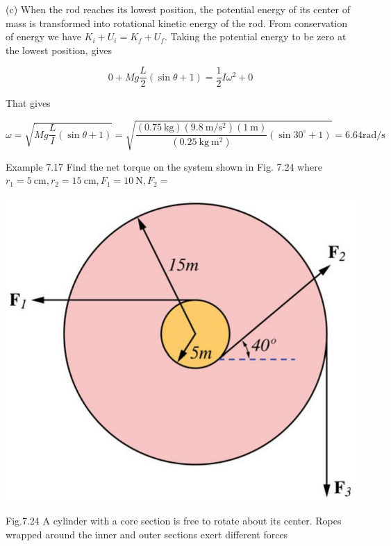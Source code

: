 \documentclass[10pt]{article}
\begin{document}
(c) When the rod reaches its lowest position, the potential energy of its center of mass is transformed into rotational kinetic energy of the rod. From conservation of energy we have $K_{i}+U_{i}=K_{f}+U_{f}$. Taking the potential energy to be zero at the lowest position, gives

$$
0+M g \frac{L}{2}(\sin \theta+1)=\frac{1}{2} I \omega^{2}+0
$$

That gives

$$
\omega=\sqrt{M g \frac{L}{I}(\sin \theta+1)}=\sqrt{\frac{(0.75 \mathrm{~kg})\left(9.8 \mathrm{~m} / \mathrm{s}^{2}\right)(1 \mathrm{~m})}{\left(0.25 \mathrm{~kg} \mathrm{~m}^{2}\right)}\left(\sin 30^{\circ}+1\right)}=6.64 \mathrm{rad} / \mathrm{s}
$$

Example 7.17 Find the net torque on the system shown in Fig. 7.24 where $r_{1}=5 \mathrm{~cm}, r_{2}=15 \mathrm{~cm}, F_{1}=10 \mathrm{~N}, F_{2}=$

\begin{center}
\includegraphics[max width=\textwidth]{2024_09_13_db1f357d2aad0a03eb2eg-124(2)}
\end{center}

Fig.7.24 A cylinder with a core section is free to rotate about its center. Ropes wrapped around the inner and outer sections exert different forces
\end{document}
